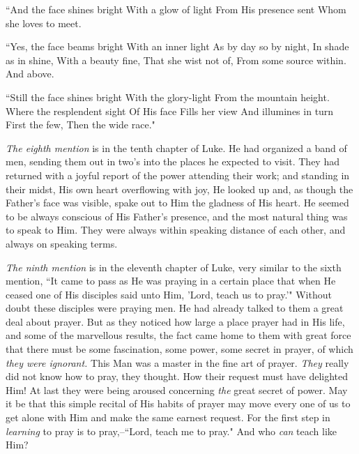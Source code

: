     ``And the face shines bright
    With a glow of light
    From His presence sent
    Whom she loves to meet.

    ``Yes, the face beams bright
    With an inner light
    As by day so by night,
    In shade as in shine,
    With a beauty fine,
    That she wist not of,
    From some source within.
       And above.

    ``Still the face shines bright
    With the glory-light
    From the mountain height.
    Where the resplendent sight
    Of His face
    Fills her view
    And illumines in turn
    First the few,
    Then the wide race."

\textit{The eighth mention} is in the tenth chapter of Luke. He had organized a
band of men, sending them out in two's into the places he expected to
visit. They had returned with a joyful report of the power attending their
work; and standing in their midst, His own heart overflowing with joy, He
looked up and, as though the Father's face was visible, spake out to Him
the gladness of His heart. He seemed to be always conscious of His
Father's presence, and the most natural thing was to speak to Him. They
were always within speaking distance of each other, and always on speaking
terms.

\textit{The ninth mention} is in the eleventh chapter of Luke, very similar to
the sixth mention, ``It came to pass as He was praying in a certain place
that when He ceased one of His disciples said unto Him, 'Lord, teach us
to pray.'" Without doubt these disciples were praying men. He had already
talked to them a great deal about prayer. But as they noticed how large a
place prayer had in His life, and some of the marvellous results, the fact
came home to them with great force that there must be some fascination,
some power, some secret in prayer, of which \textit{they were ignorant.} This Man
was a master in the fine art of prayer. \textit{They} really did not know how to
pray, they thought. How their request must have delighted Him! At last
they were being aroused concerning \textit{the} great secret of power. May it be
that this simple recital of His habits of prayer may move every one of us
to get alone with Him and make the same earnest request. For the first
step in \textit{learning} to pray is to pray,--``Lord, teach me to pray." And who
\textit{can} teach like Him?

